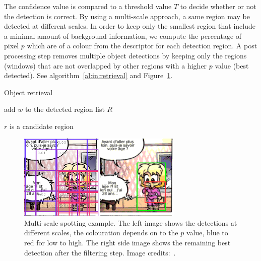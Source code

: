 The confidence value is compared to a threshold value $T$ to decide whether or not the detection is correct. By using a multi-scale approach, a same region may be detected at different scales. In order to keep only the smallest region that include a minimal amount of background information, we compute the percentage of pixel $p$ which are of a colour from the descriptor for each detection region. 
A post processing step removes multiple object detections by keeping only the regions (windows) that are not overlapped by other regions with a higher $p$ value (best detected). See algorithm~\ref{al:in:retrieval} and Figure~\ref{fig:in:filtering}.

\begin{algorithm}
\caption{Object retrieval}
\label{al:in:retrieval}
\begin{algorithmic}
  
    
	\STATE add $w$ to the detected region list $R$
    \ENDIF  
  \ENDFOR
\ENDFOR

\STATE{}
	     \STATE $r$ is a candidate region
    \ENDIF
\ENDFOR
\end{algorithmic}
\end{algorithm}



 \begin{figure}[!ht]  %
   \centering
  \includegraphics[trim= 0px 1px 0mm 0mm, clip,width=0.7\textwidth]{filtering.png}
  \caption[Multi-scale comic character spotting]{Multi-scale spotting example. The left image shows the detections at different scales, the colouration depends on to the $p$ value, blue to red for low to high. The right side image shows the remaining best detection after the filtering step. Image credits:~\cite{Bubble08}. }
  \label{fig:in:filtering}
 \end{figure}


